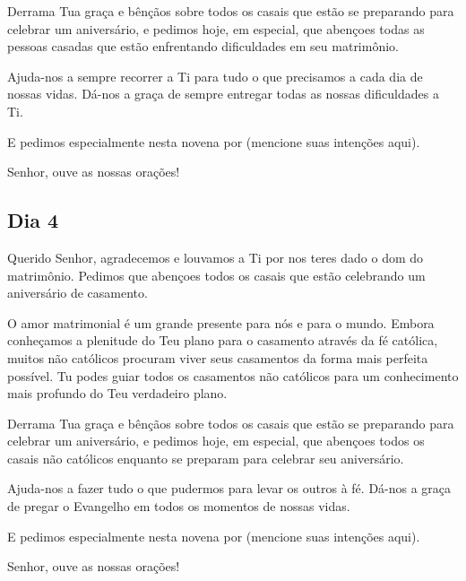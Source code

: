 \documentclass[18pt]{article}
\begin{document}
Derrama Tua graça e bênçãos sobre todos os casais que estão se preparando para celebrar um aniversário, e pedimos hoje, em especial, que abençoes todas as pessoas casadas que estão enfrentando dificuldades em seu matrimônio.  

Ajuda-nos a sempre recorrer a Ti para tudo o que precisamos a cada dia de nossas vidas. Dá-nos a graça de sempre entregar todas as nossas dificuldades a Ti.  

E pedimos especialmente nesta novena por (mencione suas intenções aqui).  

Senhor, ouve as nossas orações!  
\begin{center}
 \textbf{}
\end{center}



\begin{center}
 \subsection*{Dia 4}
\end{center}

Querido Senhor, agradecemos e louvamos a Ti por nos teres dado o dom do matrimônio. Pedimos que abençoes todos os casais que estão celebrando um aniversário de casamento.  

O amor matrimonial é um grande presente para nós e para o mundo. Embora conheçamos a plenitude do Teu plano para o casamento através da fé católica, muitos não católicos procuram viver seus casamentos da forma mais perfeita possível. Tu podes guiar todos os casamentos não católicos para um conhecimento mais profundo do Teu verdadeiro plano.  

Derrama Tua graça e bênçãos sobre todos os casais que estão se preparando para celebrar um aniversário, e pedimos hoje, em especial, que abençoes todos os casais não católicos enquanto se preparam para celebrar seu aniversário.  

Ajuda-nos a fazer tudo o que pudermos para levar os outros à fé. Dá-nos a graça de pregar o Evangelho em todos os momentos de nossas vidas.  

E pedimos especialmente nesta novena por (mencione suas intenções aqui).  

Senhor, ouve as nossas orações!  
\begin{center}
 \textbf{}
\end{center}
\end{document}
